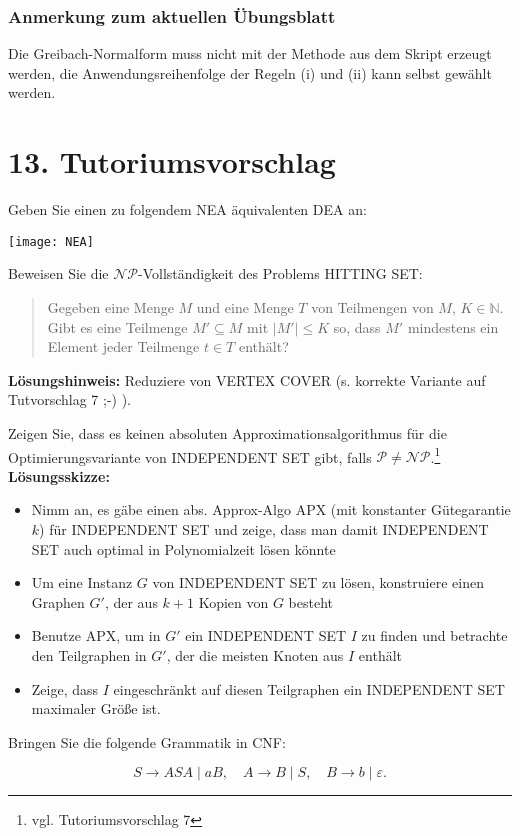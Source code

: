 \documentclass{beamer}
\begin{document}
\begin{frame}
 \frametitle{Anmerkung zum aktuellen Übungsblatt}
 Die Greibach-Normalform muss nicht mit der Methode aus dem Skript erzeugt werden,
 die Anwendungsreihenfolge der Regeln (i) und (ii) kann selbst gewählt werden.
\end{frame}

\section{13. Tutoriumsvorschlag}
\begin{frame}
Geben Sie einen zu folgendem NEA äquivalenten DEA an:

\begin{center}
 \texttt{[image: NEA]}
\end{center}
\end{frame}

\begin{frame}
Beweisen Sie die $\mathcal{NP}$-Vollständigkeit des Problems HITTING SET:
\begin{quote}
  Gegeben eine Menge $M$ und eine Menge $T$ von Teilmengen von $M$,
  $K \in \mathbb{N}$. Gibt es eine Teilmenge $M' \subseteq M$ mit $|M'| \leq K$ so,
  dass $M'$ mindestens ein Element jeder Teilmenge $t \in T$ enthält?
\end{quote}
\textbf{Lösungshinweis:}
 Reduziere von VERTEX COVER (s. korrekte Variante auf Tutvorschlag 7 ;-) ).
\end{frame}

\begin{frame}
Zeigen Sie, dass es keinen absoluten Approximationsalgorithmus für die Optimierungsvariante von
INDEPENDENT SET gibt, falls $\mathcal{P} \neq \mathcal{NP}$.\footnote{vgl. Tutoriumsvorschlag 7}
\textbf{Lösungsskizze:}
\begin{itemize}
 \item Nimm an, es gäbe einen abs. Approx-Algo APX (mit konstanter Gütegarantie $k$) für INDEPENDENT SET und zeige, dass man damit INDEPENDENT SET auch optimal in Polynomialzeit lösen könnte
 \item Um eine Instanz $G$ von INDEPENDENT SET zu lösen, konstruiere einen Graphen $G'$, der aus $k+1$ Kopien von $G$ besteht
 \item Benutze APX, um in $G'$ ein INDEPENDENT SET $I$ zu finden und betrachte den Teilgraphen in $G'$, der die meisten Knoten aus $I$ enthält
 \item Zeige, dass $I$ eingeschränkt auf diesen Teilgraphen ein INDEPENDENT SET maximaler Größe ist. 
\end{itemize}
\end{frame}

\begin{frame}
Bringen Sie die folgende Grammatik in CNF:

$$S \rightarrow ASA \mid aB, \quad A \rightarrow B \mid S, \quad
B \rightarrow b \mid \varepsilon.$$
\end{frame}


\end{document}
